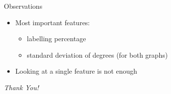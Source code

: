 \documentclass{beamer}
\begin{document}
\begin{frame}{Observations}
  \begin{itemize}
  \item Most important features:
    \begin{itemize}
    \item labelling percentage
    \item standard deviation of degrees (for both graphs)
    \end{itemize}
  \item Looking at a single feature is not enough
  \end{itemize}
  \pause
  \vfill
  \centering
  \large
  \emph{Thank You!}
\end{frame}
\end{document}
